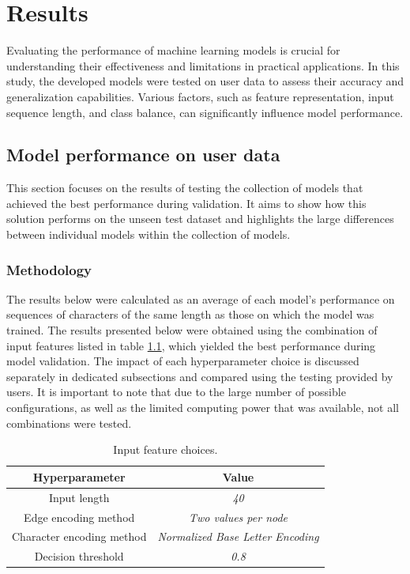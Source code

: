 \chapter{Results}
Evaluating the performance of machine learning models is crucial for understanding their effectiveness and limitations in practical applications. In this study, the developed models were tested on user data to assess their accuracy and generalization capabilities. Various factors, such as feature representation, input sequence length, and class balance, can significantly influence model performance.

\section{Model performance on user data}
This section focuses on the results of testing the collection of models that achieved the best performance during validation. It aims to show how this solution performs on the unseen test dataset and highlights the large differences between individual models within the collection of models.

\subsection{Methodology}
The results below were calculated as an average of each model's performance on sequences of characters of the same length as those on which the model was trained.
The results presented below were obtained using the combination of input features listed in table \ref{table:hyperparams}, which yielded the best performance during model validation. The impact of each hyperparameter choice is discussed separately in dedicated subsections and compared using the testing provided by users. It is important to note that due to the large number of possible configurations, as well as the limited computing power that was available, not all combinations were tested.

\begin{center}
	\begin{table}[H]
		
\begin{center}
	\begin{tabular}{ |c|c|} 
		\hline
		Hyperparameter & Value \\
		\hline
		Input length & \textit{40} \\ 
		\hline
		Edge encoding method & \textit{Two values per node} \\		
		\hline 
		Character encoding method & \textit{Normalized Base Letter Encoding} \\		 
		\hline
		Decision threshold & \textit{0.8} \\
		\hline
	\end{tabular}
\end{center}
	\caption{Input feature choices.}
	\label{table:hyperparams}
	\end{table}
\end{center}


